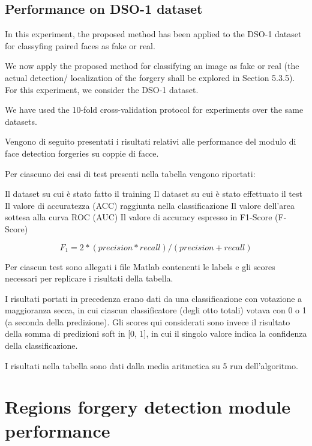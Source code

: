 \subsection{Performance on DSO-1 dataset}

In this experiment, the proposed method has been applied to the DSO-1 dataset for classyfing paired faces as fake or real.





We now apply the proposed method for classifying an image as fake or real (the actual detection/
localization of the forgery shall be explored in Section 5.3.5). For this experiment,
we consider the DSO-1 dataset.



We have used the 10-fold cross-validation protocol for experiments over the same datasets.






Vengono di seguito presentati i risultati relativi alle performance del modulo di face detection forgeries su coppie di facce.

Per ciascuno dei casi di test presenti nella tabella vengono riportati:

	Il dataset su cui è stato fatto il training
	Il dataset su cui è stato effettuato il test
	Il valore di accuratezza (ACC) raggiunta nella classificazione
	Il valore dell’area sottesa alla curva ROC (AUC)
	Il valore di accuracy espresso in F1-Score (F-Score)


$$F_1=2*(precision*recall)/(precision+recall)$$


Per ciascun test sono allegati i file Matlab contenenti le labels e gli scores necessari per replicare i risultati della tabella.


I risultati portati in precedenza erano dati da una classificazione con votazione a maggioranza secca, in cui ciascun classificatore (degli otto totali) votava con 0 o 1 (a seconda della predizione). Gli scores qui considerati sono invece il risultato della somma di predizioni soft in [0, 1], in cui il singolo valore indica la confidenza della classificazione.

I risultati nella tabella sono dati dalla media aritmetica su 5 run dell’algoritmo.

\section{Regions forgery detection module performance}



